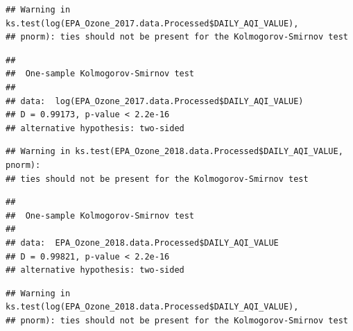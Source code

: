 \documentclass[12pt,]{article}
\newenvironment{Shaded}{\begin{snugshade}}{\end{snugshade}}
\newcommand{\KeywordTok}[1]{\textcolor[rgb]{0.13,0.29,0.53}{\textbf{#1}}}
\newcommand{\FloatTok}[1]{\textcolor[rgb]{0.00,0.00,0.81}{#1}}
\newcommand{\OperatorTok}[1]{\textcolor[rgb]{0.81,0.36,0.00}{\textbf{#1}}}
\newcommand{\NormalTok}[1]{#1}
\begin{document}
\begin{Shaded}
\end{Shaded}

\begin{verbatim}
## Warning in ks.test(log(EPA_Ozone_2017.data.Processed$DAILY_AQI_VALUE),
## pnorm): ties should not be present for the Kolmogorov-Smirnov test
\end{verbatim}

\begin{verbatim}
## 
##  One-sample Kolmogorov-Smirnov test
## 
## data:  log(EPA_Ozone_2017.data.Processed$DAILY_AQI_VALUE)
## D = 0.99173, p-value < 2.2e-16
## alternative hypothesis: two-sided
\end{verbatim}

\begin{Shaded}
\end{Shaded}

\begin{verbatim}
## Warning in ks.test(EPA_Ozone_2018.data.Processed$DAILY_AQI_VALUE, pnorm):
## ties should not be present for the Kolmogorov-Smirnov test
\end{verbatim}

\begin{verbatim}
## 
##  One-sample Kolmogorov-Smirnov test
## 
## data:  EPA_Ozone_2018.data.Processed$DAILY_AQI_VALUE
## D = 0.99821, p-value < 2.2e-16
## alternative hypothesis: two-sided
\end{verbatim}

\begin{Shaded}
\end{Shaded}

\begin{verbatim}
## Warning in ks.test(log(EPA_Ozone_2018.data.Processed$DAILY_AQI_VALUE),
## pnorm): ties should not be present for the Kolmogorov-Smirnov test
\end{verbatim}
\end{document}
